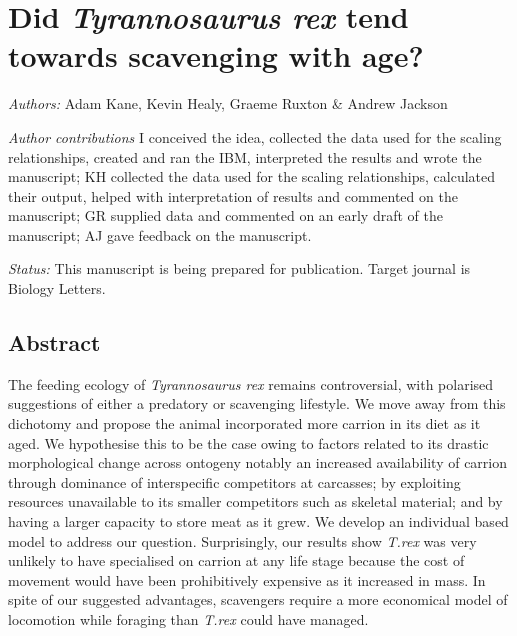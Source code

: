 \chapter{Did \textit{Tyrannosaurus rex} tend towards scavenging with age?}
\label{chap:trex}

\textit{Authors:} Adam Kane, Kevin Healy, Graeme Ruxton \& Andrew Jackson

\vspace{10 mm}
\noindent
\textit{\uppercase{A}uthor contributions}
I conceived the idea, collected the data used for the scaling relationships, created and ran the IBM, interpreted the results and wrote the manuscript; KH collected the data used for the scaling relationships, calculated their output, helped with interpretation of results and commented on the manuscript; GR supplied data and commented on an early draft of the manuscript; AJ gave feedback on the manuscript. 


\vspace{10 mm}

\noindent
\textit{Status:} This manuscript is being prepared for publication. Target journal is Biology Letters.

\newpage

\noindent

\section{\uppercase{A}bstract}

The feeding ecology of \textit{Tyrannosaurus rex} remains controversial, with polarised suggestions of either a predatory or scavenging lifestyle. We move away from this dichotomy and propose the animal incorporated more carrion in its diet as it aged. We hypothesise this to be the case owing to factors related to its drastic morphological change across ontogeny notably an increased availability of carrion through dominance of interspecific competitors at carcasses; by exploiting resources unavailable to its smaller competitors such as skeletal material; and by having a larger capacity to store meat as it grew. We develop an individual based model to address our question. Surprisingly, our results show \textit{T.rex} was very unlikely to have specialised on carrion at any life stage because the cost of movement would have been prohibitively expensive as it increased in mass. In spite of our suggested advantages, scavengers require a more economical model of locomotion while foraging than \textit{T.rex} could have managed.



